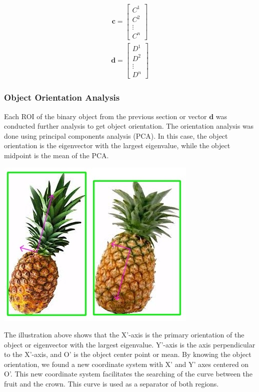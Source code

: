 \documentclass[11pt]{article}
\begin{document}
\begin{linenumbers}
\begin{multicols}{2}
	\begin{equation}
		\begin{split}
			\textbf{c} = \begin{bmatrix}
				C^1 \\
				C^2 \\
				\vdots \\
				C^n
			\end{bmatrix}
		\end{split}
	\end{equation}
	\begin{equation}
		\begin{split}
			\textbf{d} = \begin{bmatrix}
				D^1 \\
				D^2 \\
				\vdots \\
				D^n
			\end{bmatrix}
		\end{split}
	\end{equation}
\end{multicols}


\subsubsection{Object Orientation Analysis}
Each ROI of the binary object from the previous section or vector \(\textbf{d}\) was conducted further analysis to get object orientation. The orientation analysis was done using principal components analysis (PCA). In this case, the object orientation is the eigenvector with the largest eigenvalue, while the object midpoint is the mean of the PCA.
\begin{center}
	\includegraphics[scale=0.73]{images/pca}
\end{center} 
The illustration above shows that the X’-axis is the primary orientation of the object or eigenvector with the largest eigenvalue. Y’-axis is the axis perpendicular to the X’-axis, and O’ is the object center point or mean. By knowing the object orientation, we found a new coordinate system with X’ and Y’ axes centered on O’. This new coordinate system facilitates the searching of the curve between the fruit and the crown. This curve is used as a separator of both regions.


\end{linenumbers}
\end{document}
